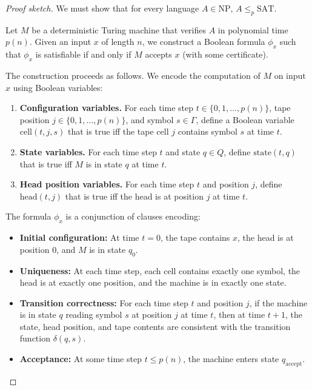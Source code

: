 \begin{proof}[Proof sketch]
We must show that for every language $A \in \text{NP}$, $A \leq_p \text{SAT}$.

Let $M$ be a deterministic Turing machine that verifies $A$ in polynomial time $p(n)$. Given an input $x$ of length $n$, we construct a Boolean formula $\phi_x$ such that $\phi_x$ is satisfiable if and only if $M$ accepts $x$ (with some certificate).

The construction proceeds as follows. We encode the computation of $M$ on input $x$ using Boolean variables:

\begin{enumerate}
  \item \textbf{Configuration variables.} For each time step $t \in \{0, 1, \ldots, p(n)\}$, tape position $j \in \{0, 1, \ldots, p(n)\}$, and symbol $s \in \Gamma$, define a Boolean variable $\text{cell}(t, j, s)$ that is true iff the tape cell $j$ contains symbol $s$ at time $t$.

  \item \textbf{State variables.} For each time step $t$ and state $q \in Q$, define $\text{state}(t, q)$ that is true iff $M$ is in state $q$ at time $t$.

  \item \textbf{Head position variables.} For each time step $t$ and position $j$, define $\text{head}(t, j)$ that is true iff the head is at position $j$ at time $t$.
\end{enumerate}

The formula $\phi_x$ is a conjunction of clauses encoding:
\begin{itemize}
  \item \textbf{Initial configuration:} At time $t = 0$, the tape contains $x$, the head is at position 0, and $M$ is in state $q_0$.
  \item \textbf{Uniqueness:} At each time step, each cell contains exactly one symbol, the head is at exactly one position, and the machine is in exactly one state.
  \item \textbf{Transition correctness:} For each time step $t$ and position $j$, if the machine is in state $q$ reading symbol $s$ at position $j$ at time $t$, then at time $t+1$, the state, head position, and tape contents are consistent with the transition function $\delta(q, s)$.
  \item \textbf{Acceptance:} At some time step $t \leq p(n)$, the machine enters state $q_{\text{accept}}$.
\end{itemize}


\end{proof}
